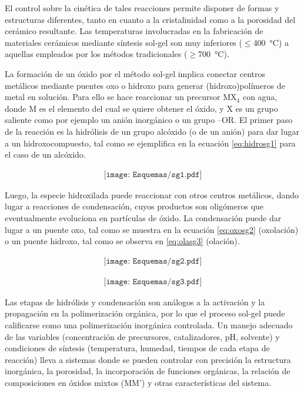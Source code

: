 	 El control sobre la cinética de tales reacciones permite disponer de formas y estructuras diferentes, tanto en cuanto a la cristalinidad como a la porosidad del cerámico resultante. Las temperaturas involucradas en la fabricación de materiales cerámicos mediante síntesis sol-gel son muy inferiores ($\leq$\SI{400}{\celsius}) a aquellas empleados por  los métodos tradicionales ($\geq$\SI{700}{\celsius}).\cite{Brinker1990,Jolivet2000,Wright2001}

	 La formación de un óxido por el método sol-gel implica conectar centros metálicos mediante puentes oxo o hidroxo para generar (hidroxo)polímeros de metal en solución. Para ello se hace reaccionar un precursor MX$_4$ con agua, donde M es el elemento del cual se quiere obtener el óxido, y X es un grupo saliente como por ejemplo un anión inorgánico o un grupo –OR. El primer paso de la reacción es la hidrólisis de un grupo alcóxido (o de un anión) para dar lugar a un hidroxocompuesto, tal como se ejemplifica en la ecuación \ref{eq:hidrosg1} para el caso de un alcóxido.
			
			 \begin{equation}
 				\begin{aligned}
 				\texttt{[image: Esquemas/sg1.pdf]}
 				\end{aligned}
 				\label{eq:hidrosg1}
 	 			\end{equation}

    	Luego, la especie hidroxilada puede reaccionar con otros centros metálicos, dando lugar a reacciones de condensación, cuyos productos son oligómeros que eventualmente evoluciona en partículas de óxido. La condensación puede dar lugar a un puente oxo, tal como se muestra en la ecuación \ref{eq:oxosg2} (oxolación) o un puente hidroxo, tal como se observa en \ref{eq:olasg3} (olación). 

			\begin{equation}
		    	\begin{aligned}
 	 	 		\texttt{[image: Esquemas/sg2.pdf]}
 	 	 		\end{aligned}
 	 	 		\label{eq:oxosg2}
 	 	 		\end{equation}

			\begin{equation}
 	 	 		\begin{aligned}
 	 	 		\texttt{[image: Esquemas/sg3.pdf]}
 	 	 		\label{eq:olasg3}
 	 	 		\end{aligned}
 	 	 		\end{equation}

	 Las etapas de hidrólisis y condensación son análogos a la activación y la propagación en la polimerización orgánica, por lo que el proceso sol-gel puede calificarse como una polimerización inorgánica controlada. Un manejo adecuado de las variables (concentración de precursores, catalizadores, pH, solvente) y condiciones de síntesis (temperatura, humedad, tiempos de cada etapa de reacción) lleva a sistemas donde se pueden controlar con precisión  la estructura inorgánica, la porosidad, la incorporación de funciones orgánicas, la relación de composiciones en óxidos mixtos (MM') y otras características del sistema.

